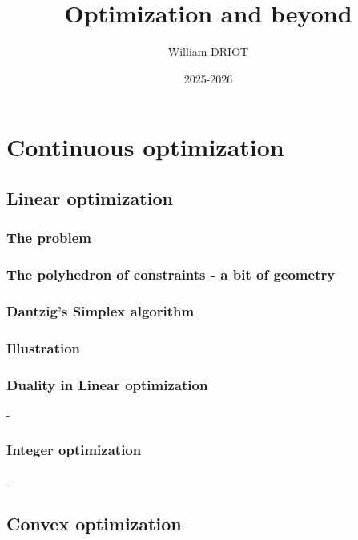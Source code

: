 \documentclass[12pt,openany,oneside]{book}
\title{\textbf{Optimization and beyond}}
\author{William DRIOT}
\date{2025-2026}
\theoremstyle{definition}
\numberwithin{definition}{section}
\numberwithin{theorem}{section}
\numberwithin{corollary}{section}
\numberwithin{proposition}{section}
\numberwithin{notation}{section}
\numberwithin{remark}{section}
\numberwithin{hypothesis}{section}
\numberwithin{example}{section}
\begin{document}
\maketitle

\tableofcontents

\setlength{\parindent}{15pt}
\setlength{\parskip}{6pt}

\newpage



\part{Continuous optimization}

\chapter{Linear optimization}

\section{The problem}

\section{The polyhedron of constraints - a bit of geometry}

\section{Dantzig's Simplex algorithm}

\section{Illustration}

\section{Duality in Linear optimization}-
\section{Integer optimization}-

\chapter{Convex optimization}
\end{document}
